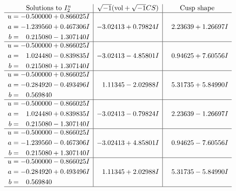 \documentclass[1p]{elsarticle_modified}
\theoremstyle{definition}
\newcommand{\I}{\sqrt{-1}}
\begin{document}
$$\begin{array}{c|c|c}  
\text{Solutions to }I^u_{2}& \I (\text{vol} + \sqrt{-1}CS) & \text{Cusp shape}\\
 \hline 
\begin{aligned}
u &= -0.500000 + 0.866025 I \\
a &= -1.239560 + 0.467306 I \\
b &= \phantom{-}0.215080 - 1.307140 I\end{aligned}
 & -3.02413 + 0.79824 I & \phantom{-}2.23639 + 1.26697 I \\ \hline\begin{aligned}
u &= -0.500000 + 0.866025 I \\
a &= \phantom{-}1.024480 - 0.839835 I \\
b &= \phantom{-}0.215080 + 1.307140 I\end{aligned}
 & -3.02413 - 4.85801 I & \phantom{-}0.94625 + 7.60556 I \\ \hline\begin{aligned}
u &= -0.500000 + 0.866025 I \\
a &= -0.284920 - 0.493496 I \\
b &= \phantom{-}0.569840\phantom{ +0.000000I}\end{aligned}
 & \phantom{-}1.11345 - 2.02988 I & \phantom{-}5.31735 + 5.84990 I \\ \hline\begin{aligned}
u &= -0.500000 - 0.866025 I \\
a &= \phantom{-}1.024480 + 0.839835 I \\
b &= \phantom{-}0.215080 - 1.307140 I\end{aligned}
 & -3.02413 - 0.79824 I & \phantom{-}2.23639 - 1.26697 I \\ \hline\begin{aligned}
u &= -0.500000 - 0.866025 I \\
a &= -1.239560 - 0.467306 I \\
b &= \phantom{-}0.215080 + 1.307140 I\end{aligned}
 & -3.02413 + 4.85801 I & \phantom{-}0.94625 - 7.60556 I \\ \hline\begin{aligned}
u &= -0.500000 - 0.866025 I \\
a &= -0.284920 + 0.493496 I \\
b &= \phantom{-}0.569840\phantom{ +0.000000I}\end{aligned}
 & \phantom{-}1.11345 + 2.02988 I & \phantom{-}5.31735 - 5.84990 I\\
 \hline 
 \end{array}$$\newpage
\end{document}
